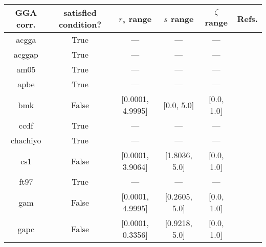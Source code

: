 \begin{tabular}{|c|c|c|c|c|l|}
\hline
     GGA corr. &  satisfied condition? &      $r_s$ range &        $s$ range &   $\zeta$ range  &                                                          Refs. \\ \hline
         acgga &                  True &              --- &              --- &              --- &                        \cite{Cancio2018_084116,Burke2014_4834} \\ \hline
        acggap &                  True &              --- &              --- &              --- &                        \cite{Cancio2018_084116,Burke2014_4834} \\ \hline
          am05 &                  True &              --- &              --- &              --- &                 \cite{Armiento2005_085108,Mattsson2008_084714} \\ \hline
          apbe &                  True &              --- &              --- &              --- &                                   \cite{Constantin2011_186406} \\ \hline
           bmk &                 False & [0.0001, 4.9995] &       [0.0, 5.0] &       [0.0, 1.0] &                                          \cite{Boese2004_3405} \\ \hline
          ccdf &                  True &              --- &              --- &              --- &                                      \cite{Margraf2019_244116} \\ \hline
      chachiyo &                  True &              --- &              --- &              --- &                                     \cite{Chachiyo2020_112669} \\ \hline
           cs1 &                 False & [0.0001, 3.9064] &    [1.8036, 5.0] &       [0.0, 1.0] &                          \cite{Handy2002_5411,Proynov2006_436} \\ \hline
          ft97 &                  True &              --- &              --- &              --- &                         \cite{Filatov1997_603,Filatov1997_847} \\ \hline
           gam &                 False & [0.0001, 4.9995] &    [0.2605, 5.0] &       [0.0, 1.0] &                                            \cite{Yu2015_12146} \\ \hline
          gapc &                 False & [0.0001, 0.3356] &    [0.9218, 5.0] &       [0.0, 1.0] &                                        \cite{Fabiano2014_2016} \\ \hline

\end{tabular}
